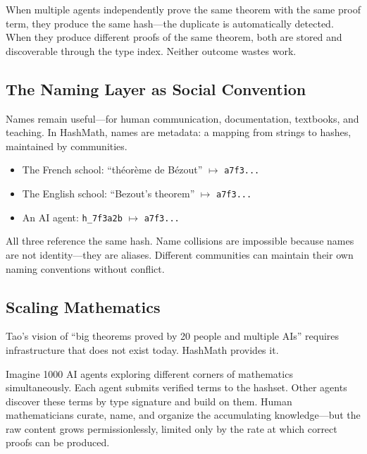 \documentclass[11pt]{article}
\theoremstyle{definition}
\theoremstyle{plain}
\theoremstyle{remark}
\begin{document}
When multiple agents independently prove the same theorem with the same proof term, they
produce the same hash---the duplicate is automatically detected.
When they produce different proofs of the same theorem, both are stored and discoverable
through the type index.
Neither outcome wastes work.

\subsection{The Naming Layer as Social Convention}
\label{sec:naming-layer}

Names remain useful---for human communication, documentation, textbooks, and teaching.
In HashMath, names are metadata: a mapping from strings to hashes, maintained by communities.

\begin{itemize}[nosep]
  \item The French school: ``th\'eor\`eme de B\'ezout'' $\mapsto$ \texttt{a7f3...}
  \item The English school: ``Bezout's theorem'' $\mapsto$ \texttt{a7f3...}
  \item An AI agent: \texttt{h\_7f3a2b} $\mapsto$ \texttt{a7f3...}
\end{itemize}

All three reference the same hash.
Name collisions are impossible because names are not identity---they are aliases.
Different communities can maintain their own naming conventions without conflict.

\subsection{Scaling Mathematics}
\label{sec:scaling}

Tao's vision of ``big theorems proved by 20 people and multiple AIs'' requires infrastructure
that does not exist today.
HashMath provides it.

Imagine 1000 AI agents exploring different corners of mathematics simultaneously.
Each agent submits verified terms to the hashset.
Other agents discover these terms by type signature and build on them.
Human mathematicians curate, name, and organize the accumulating knowledge---but the raw
content grows permissionlessly, limited only by the rate at which correct proofs can be produced.
\end{document}
